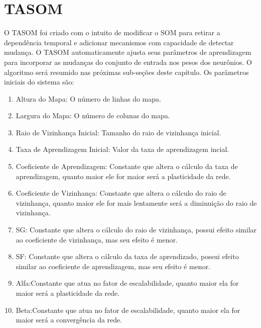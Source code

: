 \chapter{TASOM}
O TASOM foi criado com o intuito de modificar o SOM para retirar a dependência temporal e adicionar mecanismos com capacidade de detectar mudança. O TASOM automaticamente ajusta seus parâmetros de aprendizagem para incorporar as mudanças do conjunto de entrada nos pesos dos neurônios. O algoritmo será resumido nas próximas sub-seções deste capítulo. Os parâmetros iniciais do sistema são:
\begin{enumerate}
\item Altura do Mapa: O número de linhas do mapa.
\item Largura do Mapa: O número de colunas do mapa.
\item Raio de Vizinhança Inicial: Tamanho do raio de vizinhança inicial.
\item Taxa de Aprendizagem Inicial: Valor da taxa de aprendizagem incial.
\item Coeficiente de Aprendizagem: Constante que altera o cálculo da taxa de aprendizagem, quanto maior ele for maior será a plasticidade da rede.
\item Coeficiente de Vizinhança: Constante que altera o cálculo do raio de vizinhança, quanto maior ele for mais lentamente será a diminuição do raio de vizinhança.
\item SG: Constante que altera o cálculo do raio de vizinhança, possui efeito similar ao coeficiente de vizinhança, mas seu efeito é menor.
\item SF: Constante que altera o cálculo da taxa de aprendizado, possui efeito similar ao coeficiente de aprendizagem, mas seu efeito é menor.
\item Alfa:Constante que atua no fator de escalabilidade, quanto maior ela for maior será a plasticidade da rede.
\item Beta:Constante que atua no fator de escalabilidade, quanto maior ela for maior será a convergência da rede.
\end{enumerate}
 

